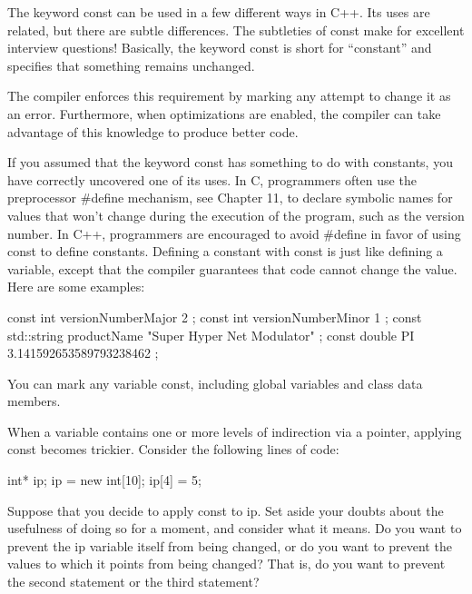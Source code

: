 
The keyword const can be used in a few different ways in C++. Its uses are related, but there are subtle differences. The subtleties of const make for excellent interview questions! Basically, the keyword const is short for “constant” and specifies that something remains unchanged.

The compiler enforces this requirement by marking any attempt to change it as an error. Furthermore, when optimizations are enabled, the compiler can take advantage of this knowledge to produce better code.


If you assumed that the keyword const has something to do with constants, you have correctly uncovered one of its uses. In C, programmers often use the preprocessor \#define mechanism, see Chapter 11, to declare symbolic names for values that won’t change during the execution of the program, such as the version number. In C++, programmers are encouraged to avoid \#define in favor of using const to define constants. Defining a constant with const is just like defining a variable, except that the compiler guarantees that code cannot change the value. Here are some examples:

\begin{cpp}
const int versionNumberMajor { 2 };
const int versionNumberMinor { 1 };
const std::string productName { "Super Hyper Net Modulator" };
const double PI { 3.141592653589793238462 };
\end{cpp}

You can mark any variable const, including global variables and class data members.


When a variable contains one or more levels of indirection via a pointer, applying const becomes trickier. Consider the following lines of code:

\begin{cpp}
int* ip;
ip = new int[10];
ip[4] = 5;
\end{cpp}

Suppose that you decide to apply const to ip. Set aside your doubts about the usefulness of doing so for a moment, and consider what it means. Do you want to prevent the ip variable itself from being changed, or do you want to prevent the values to which it points from being changed? That is, do you want to prevent the second statement or the third statement?

